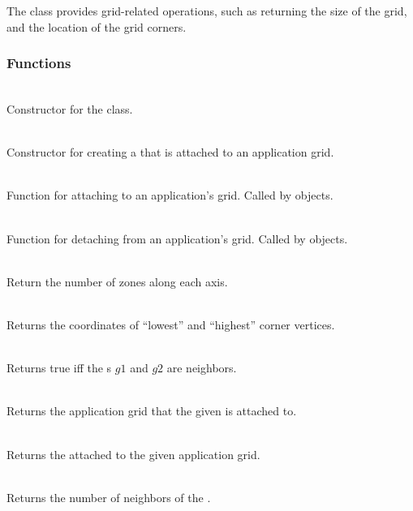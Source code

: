 \documentclass[11pt]{article}
\begin{document}
   The  class provides grid-related operations, such as returning
   the size of the grid, and the location of the grid corners.


\subsubsection{ Functions}

     \\
    Constructor for the  class.

     \\
    Constructor for creating a  that is attached
    to an application grid.

     \\
    Function for attaching to an application's grid.  Called by
     objects.

     \\
    Function for detaching from an application's grid.  Called by
     objects.

     \\
    Return the number of zones along each axis.

     \\ 
    Returns the coordinates of ``lowest'' and ``highest'' corner vertices.

     \\ 
    Returns true iff the s $g1$ and $g2$ are neighbors.
    
     \\
    Returns the application grid that the given  is attached to.

     \\ 
    Returns the  attached to the given application grid.

     \\
    Returns the number of neighbors of the .
\end{document}
